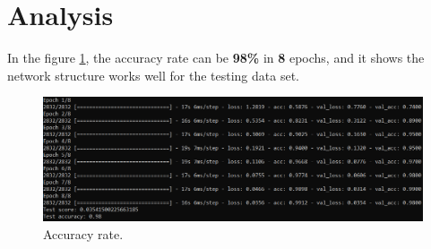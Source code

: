 \section{Analysis}
\indent\indent
	In the figure \ref{anal_2}, the accuracy rate can be \textbf{98\%} in \textbf{8} epochs, and it shows the network structure works well for the testing data set.

	\begin{figure}[H]
		\centering
		\label{anal_2}
		\includegraphics[scale=0.5]{img/sample_train_1.PNG}
		\caption{Accuracy rate.}
	\end{figure}
	

